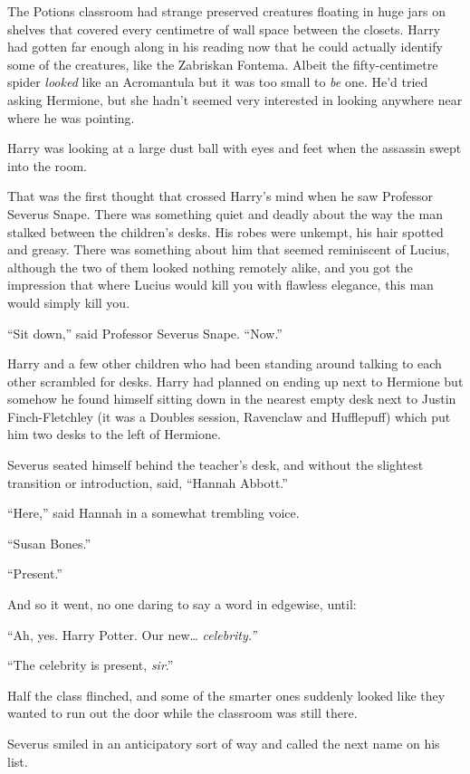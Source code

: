 The Potions classroom had strange preserved creatures floating in huge
jars on shelves that covered every centimetre of wall space between the
closets. Harry had gotten far enough along in his reading now that he
could actually identify some of the creatures, like the Zabriskan
Fontema. Albeit the fifty-centimetre spider \emph{looked} like an
Acromantula but it was too small to \emph{be} one. He'd tried asking
Hermione, but she hadn't seemed very interested in looking anywhere near
where he was pointing.

Harry was looking at a large dust ball with eyes and feet when the
assassin swept into the room.

That was the first thought that crossed Harry's mind when he saw
Professor Severus Snape. There was something quiet and deadly about the
way the man stalked between the children's desks. His robes were
unkempt, his hair spotted and greasy. There was something about him that
seemed reminiscent of Lucius, although the two of them looked nothing
remotely alike, and you got the impression that where Lucius would kill
you with flawless elegance, this man would simply kill you.

``Sit down,'' said Professor Severus Snape. ``Now.''

Harry and a few other children who had been standing around talking to
each other scrambled for desks. Harry had planned on ending up next to
Hermione but somehow he found himself sitting down in the nearest empty
desk next to Justin Finch-Fletchley (it was a Doubles session, Ravenclaw
and Hufflepuff) which put him two desks to the left of Hermione.

Severus seated himself behind the teacher's desk, and without the
slightest transition or introduction, said, ``Hannah Abbott.''

``Here,'' said Hannah in a somewhat trembling voice.

``Susan Bones.''

``Present.''

And so it went, no one daring to say a word in edgewise, until:

``Ah, yes. Harry Potter. Our new\ldots{} \emph{celebrity.''}

``The celebrity is present, \emph{sir}.''

Half the class flinched, and some of the smarter ones suddenly looked
like they wanted to run out the door while the classroom was still
there.

Severus smiled in an anticipatory sort of way and called the next name
on his list.

